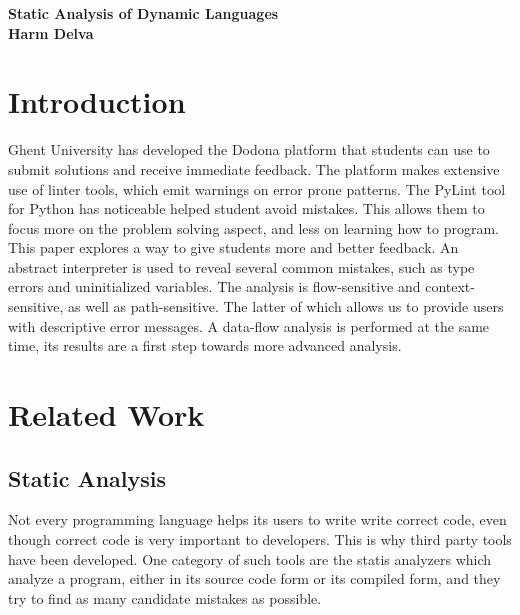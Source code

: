 \documentclass[a4paper, 11pt]{article}
\begin{document}



\thispagestyle{plain}
\begin{center}{\huge\bf Static Analysis of Dynamic Languages\\\small Harm Delva\par}\end{center}
\vfil\vfil\null

\setlength\columnsep{16pt}


\begin{multicols*}{2}

\section{Introduction}
Ghent University has developed the Dodona platform that students can use to submit solutions and receive immediate feedback. The platform makes extensive use of linter tools, which emit warnings on error prone patterns. The PyLint tool for Python has noticeable helped student avoid mistakes. This allows them to focus more on the problem solving aspect, and less on learning how to program. \\

This paper explores a way to give students more and better feedback. An abstract interpreter is used to reveal several common mistakes, such as type errors and uninitialized variables. The analysis is flow-sensitive and context-sensitive, as well as path-sensitive. The latter of which allows us to provide users with descriptive error messages. A data-flow analysis is performed at the same time, its results are a first step towards more advanced analysis.

\section{Related Work}
\subsection{Static Analysis}

Not every programming language helps its users to write write correct code, even though correct code is very important to developers. This is why third party tools have been developed. One category of such tools are the statis analyzers which analyze a program, either in its source code form or its compiled form, and they try to find as many candidate mistakes as possible. \\


\end{multicols*}
\end{document}
